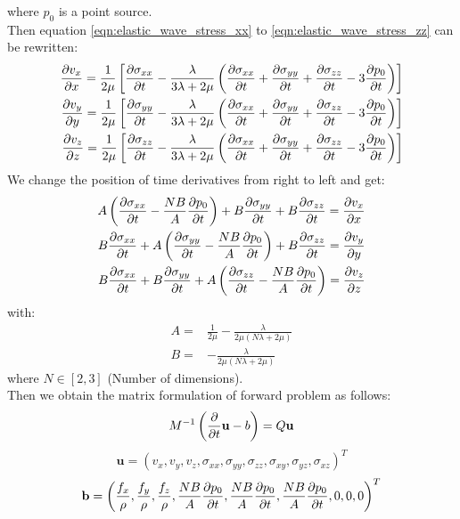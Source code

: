 \documentclass[pdftex,a4paper,parskip,listof=totoc,bibliography=totoc,onehalfspacing,12pt]{scrreprt}
\begin{document}
where $p_0$ is a point source.\\
Then equation \ref{eqn:elastic_wave_stress_xx} to \ref{eqn:elastic_wave_stress_zz} can be rewritten:
\begin{align}
\label{eqn:elastic_wave_velocity_xx}
\pdv{v_x}{x}=\frac{1}{2\mu} \left[\pdv{\sigma_{xx}}{t} - \frac{\lambda}{3\lambda+2\mu} \left(\pdv{\sigma_{xx}}{t}+\pdv{\sigma_{yy}}{t}+\pdv{\sigma_{zz}}{t}-3\pdv{p_0}{t}\right)\right]\\
\pdv{v_y}{y}=\frac{1}{2\mu} \left[\pdv{\sigma_{yy}}{t} - \frac{\lambda}{3\lambda+2\mu} \left(\pdv{\sigma_{xx}}{t}+\pdv{\sigma_{yy}}{t}+\pdv{\sigma_{zz}}{t}-3\pdv{p_0}{t}\right)\right]\\
\label{eqn:elastic_wave_velocity_zz}
\pdv{v_z}{z}=\frac{1}{2\mu} \left[\pdv{\sigma_{zz}}{t} - \frac{\lambda}{3\lambda+2\mu} \left(\pdv{\sigma_{xx}}{t}+\pdv{\sigma_{yy}}{t}+\pdv{\sigma_{zz}}{t}-3\pdv{p_0}{t}\right)\right]
\end{align}
We change the position of time derivatives from right to left and get:
\begin{align}
A \left( \pdv{\sigma_{xx}}{t}-\frac{NB}{A} \pdv{p_0}{t} \right) + B \pdv{\sigma_{yy}}{t}+B\pdv{\sigma_{zz}}{t}=\pdv{v_x}{x}\\
B\pdv{\sigma_{xx}}{t} + A \left( \pdv{\sigma_{yy}}{t}-\frac{NB}{A} \pdv{p_0}{t} \right)+B\pdv{\sigma_{zz}}{t}=\pdv{v_y}{y}\\
B\pdv{\sigma_{xx}}{t} + B \pdv{\sigma_{yy}}{t}+A \left( \pdv{\sigma_{zz}}{t}-\frac{NB}{A} \pdv{p_0}{t} \right)=\pdv{v_z}{z}
\end{align}
with:
\begin{align}
A=&\frac{1}{2\mu}-\frac{\lambda}{2\mu(N\lambda+2\mu)}\\
B=&-\frac{\lambda}{2\mu(N\lambda+2\mu)}
\end{align}
where $N\in[2,3]$ (Number of dimensions).\\
Then we obtain the matrix formulation of forward problem as follows:
\begin{equation}
 M^{-1}\left( \pdv{}{t}\mathbf{u}-b \right) =Q\mathbf{u}
\end{equation}
\begin{equation}
\mathbf{u}=\left(v_x,v_y,v_z,\sigma_{xx},\sigma_{yy},\sigma_{zz},\sigma_{xy},\sigma_{yz} ,\sigma_{xz} \right)^T
\end{equation}
\begin{equation}
\mathbf{b}=\left(\frac{f_x}{\rho}, \frac{f_y}{\rho}, \frac{f_z}{\rho},\frac{NB}{A} \pdv{p_0}{t},\frac{NB}{A} \pdv{p_0}{t},\frac{NB}{A} \pdv{p_0}{t},0,0,0\right)^T
\end{equation}
\end{document}
